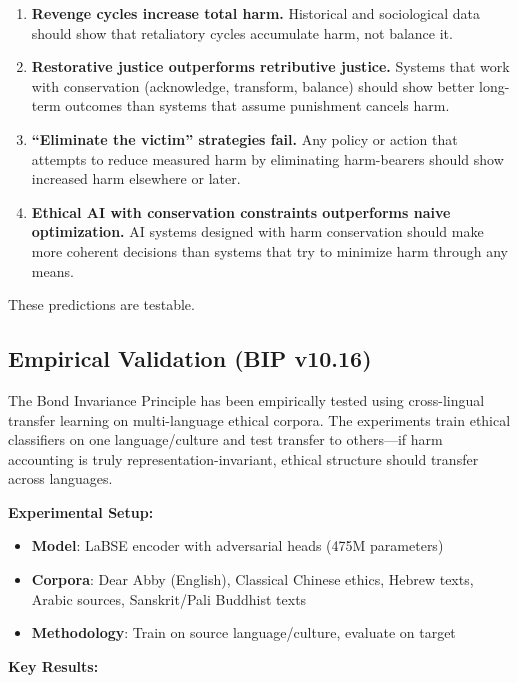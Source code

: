 \documentclass[12pt,letterpaper]{article}
\theoremstyle{definition}
\theoremstyle{remark}
\begin{document}
\begin{enumerate}
    \item \textbf{Revenge cycles increase total harm.} Historical and sociological data should show that retaliatory cycles accumulate harm, not balance it.
    
    \item \textbf{Restorative justice outperforms retributive justice.} Systems that work with conservation (acknowledge, transform, balance) should show better long-term outcomes than systems that assume punishment cancels harm.
    
    \item \textbf{``Eliminate the victim'' strategies fail.} Any policy or action that attempts to reduce measured harm by eliminating harm-bearers should show increased harm elsewhere or later.
    
    \item \textbf{Ethical AI with conservation constraints outperforms naive optimization.} AI systems designed with harm conservation should make more coherent decisions than systems that try to minimize harm through any means.
\end{enumerate}

These predictions are testable.

\subsection{Empirical Validation (BIP v10.16)}

The Bond Invariance Principle has been empirically tested using cross-lingual transfer learning on multi-language ethical corpora. The experiments train ethical classifiers on one language/culture and test transfer to others---if harm accounting is truly representation-invariant, ethical structure should transfer across languages.

\textbf{Experimental Setup:}
\begin{itemize}
    \item \textbf{Model}: LaBSE encoder with adversarial heads (475M parameters)
    \item \textbf{Corpora}: Dear Abby (English), Classical Chinese ethics, Hebrew texts, Arabic sources, Sanskrit/Pali Buddhist texts
    \item \textbf{Methodology}: Train on source language/culture, evaluate on target
\end{itemize}

\textbf{Key Results:}
\end{document}
